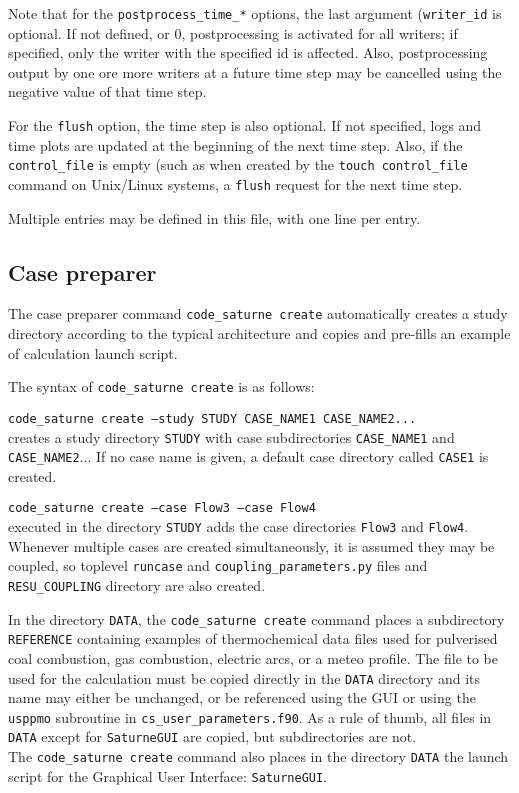 {{{{{Note that for the \texttt{postprocess\_time\_*} options, the last argument
(\texttt{writer\_id}} is optional. If not defined, or 0, postprocessing
is activated for all writers; if specified, only the writer with the specified
id is affected. Also, postprocessing output by one ore more writers at a
future time step may be cancelled using the negative value of that time step.

For the \texttt{flush} option, the time step is also optional. If not
specified, logs and time plots are updated at the beginning of the
next time step. Also, if the \texttt{control\_file} is empty (such as
when created by the \texttt{touch control\_file} command on Unix/Linux
systems, a \texttt{flush} request for the next time step.

Multiple entries may be defined in this file, with one line per entry.

\subsection{Case preparer}
\label{sec:prg_cscreate}%
The case preparer command \texttt{code\_saturne~create} automatically creates a
study directory according to the typical architecture and copies and
pre-fills an example of calculation launch script.

The syntax of \texttt{code\_saturne~create} is as follows:

\noindent
\texttt{code\_saturne~create --study STUDY CASE\_NAME1 CASE\_NAME2...}\\
creates a study directory \texttt{STUDY} with case subdirectories
\texttt{CASE\_NAME1} and \texttt{CASE\_NAME2}...
If no case name is given, a default case directory called \texttt{CASE1} is
created.

\noindent
\texttt{code\_saturne~create --case Flow3 --case Flow4}\\
executed in the directory \texttt{STUDY} adds the case directories
\texttt{Flow3} and \texttt{Flow4}. Whenever multiple cases are created simultaneously, it is assumed they may be coupled, so toplevel \texttt{runcase} and \texttt{coupling\_parameters.py} files and \texttt{RESU\_COUPLING} directory are also created.

In the directory \texttt{DATA}, the \texttt{code\_saturne~create} command
places a subdirectory \texttt{REFERENCE} containing examples of thermochemical
data files used for pulverised coal combustion, gas combustion, electric arcs, or
a meteo profile. The file to be used for the calculation must be copied directly
in the \texttt{DATA} directory and its name may either be unchanged, or
be referenced using the GUI or using the \texttt{usppmo} subroutine in
\texttt{cs\_user\_parameters.f90}. As a rule of thumb, all files in \texttt{DATA}
except for \texttt{SaturneGUI} are copied, but subdirectories are not.\\
The \texttt{code\_saturne~create} command also places in the directory
\texttt{DATA} the launch script for the Graphical User Interface:
\texttt{SaturneGUI}.

}}}}
